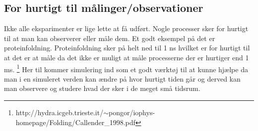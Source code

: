 \subsection{For hurtigt til målinger/observationer}
Ikke alle eksparimenter er lige lette at få udført. Nogle processer sker for 
hurtigt til at man kan observerer eller måle dem. Et godt eksempel på det er 
proteinfoldning. Proteinfoldning sker på helt ned til 1 ns hvilket er for 
hurtigt til at det er at måle da det ikke er muligt at måle processerne der 
er hurtiger end 1 ms.
\footnote{http://hydra.icgeb.trieste.it/$\sim$pongor/iophys-homepage/Folding/Callender\_1998.pdf}
Her til kommer simulering ind som et godt værktøj til at kunne hjælpe da man
i en simuleret verden kan ændre på hvor hurtigt tiden går og derved kan man
observere og studere hvad der sker i de meget små tidsrum.
